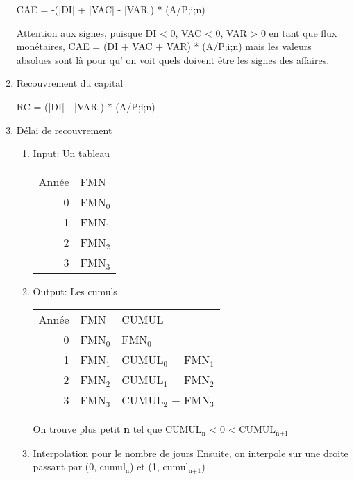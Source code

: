 \documentclass[11pt]{article}
\begin{document}
\begin{enumerate}
CAE = -(|DI| + |VAC| - |VAR|) * (A/P;i;n)

Attention aux signes, puisque DI < 0, VAC < 0, VAR > 0 en tant que flux
monétaires, CAE = (DI + VAC + VAR) * (A/P;i;n) mais les valeurs absolues sont là
pour qu' on voit quels doivent être les signes des affaires.

\item Recouvrement du capital
\label{sec:org6c781c6}

RC = (|DI| - |VAR|) * (A/P;i;n)

\item Délai de recouvrement
\label{sec:org49a287f}

\begin{enumerate}
\item Input: Un tableau
\label{sec:org04f6927}

\begin{center}
\begin{tabular}{rl}
Année & FMN\\
0 & FMN\(_{\text{0}}\)\\
1 & FMN\(_{\text{1}}\)\\
2 & FMN\(_{\text{2}}\)\\
3 & FMN\(_{\text{3}}\)\\
\end{tabular}
\end{center}

\item Output: Les cumuls
\label{sec:orgc37f937}

\begin{center}
\begin{tabular}{rll}
Année & FMN & CUMUL\\
0 & FMN\(_{\text{0}}\) & FMN\(_{\text{0}}\)\\
1 & FMN\(_{\text{1}}\) & CUMUL\(_{\text{0}}\) + FMN\(_{\text{1}}\)\\
2 & FMN\(_{\text{2}}\) & CUMUL\(_{\text{1}}\) + FMN\(_{\text{2}}\)\\
3 & FMN\(_{\text{3}}\) & CUMUL\(_{\text{2}}\) + FMN\(_{\text{3}}\)\\
\end{tabular}
\end{center}

On trouve plus petit \textbf{n} tel que CUMUL\(_{\text{n}}\) < 0 < CUMUL\(_{\text{n+1}}\)

\item Interpolation pour le nombre de jours
\label{sec:org05baa25}
Ensuite, on interpole sur une droite passant par (0, cumul\(_{\text{n}}\)) et (1, cumul\(_{\text{n+1}}\))


\end{enumerate}
\end{enumerate}
\end{document}
